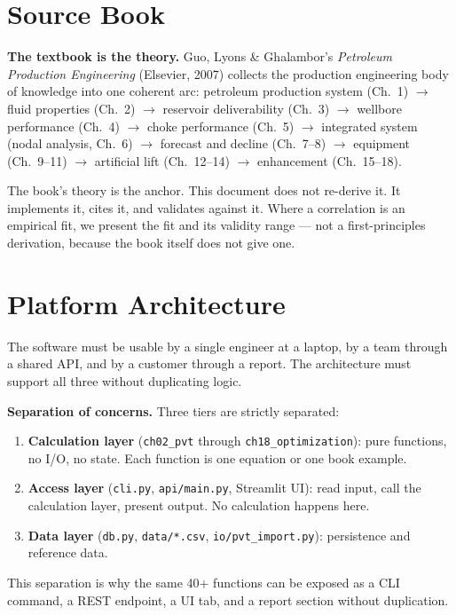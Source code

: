 \documentclass[11pt,a4paper,openany]{book}
\newcommand{\code}[1]{\texttt{#1}}
\begin{document}
\section{Source Book}

\begin{theory}
\textbf{The textbook is the theory.} Guo, Lyons \& Ghalambor's
\emph{Petroleum Production Engineering} (Elsevier, 2007) collects the
production engineering body of knowledge into one coherent arc:
petroleum production system (Ch.~1) $\to$ fluid properties (Ch.~2)
$\to$ reservoir deliverability (Ch.~3) $\to$ wellbore performance
(Ch.~4) $\to$ choke performance (Ch.~5) $\to$ integrated system
(nodal analysis, Ch.~6) $\to$ forecast and decline (Ch.~7--8) $\to$
equipment (Ch.~9--11) $\to$ artificial lift (Ch.~12--14) $\to$
enhancement (Ch.~15--18).

The book's theory is the anchor. This document does not re-derive it.
It implements it, cites it, and validates against it. Where a
correlation is an empirical fit, we present the fit and its validity
range — not a first-principles derivation, because the book itself
does not give one.
\end{theory}

\section{Platform Architecture}

\begin{purpose}
The software must be usable by a single engineer at a laptop, by a
team through a shared API, and by a customer through a report. The
architecture must support all three without duplicating logic.
\end{purpose}

\begin{theory}
\textbf{Separation of concerns.} Three tiers are strictly separated:

\begin{enumerate}
  \item \textbf{Calculation layer} (\code{ch02\_pvt} through
        \code{ch18\_optimization}): pure functions, no I/O, no state.
        Each function is one equation or one book example.
  \item \textbf{Access layer} (\code{cli.py}, \code{api/main.py},
        Streamlit UI): read input, call the calculation layer, present
        output. No calculation happens here.
  \item \textbf{Data layer} (\code{db.py}, \code{data/*.csv},
        \code{io/pvt\_import.py}): persistence and reference data.
\end{enumerate}

This separation is why the same 40+ functions can be exposed as a
CLI command, a REST endpoint, a UI tab, and a report section without
duplication.
\end{theory}
\end{document}
